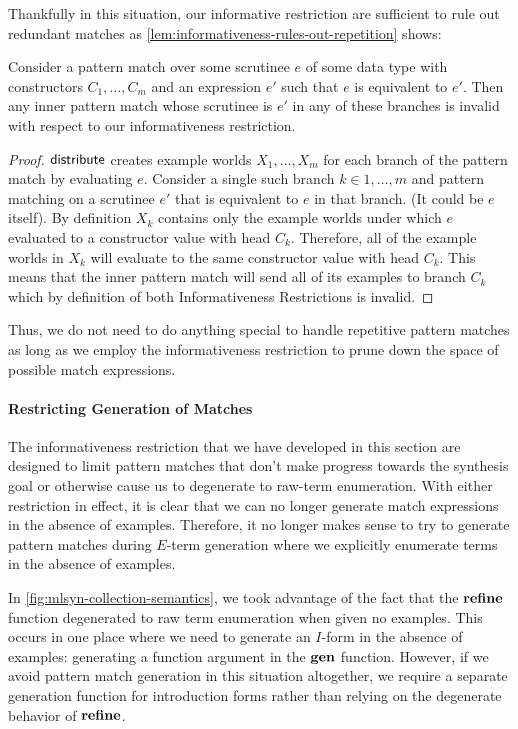 Thankfully in this situation, our informative restriction are sufficient to rule out redundant matches as \autoref{lem:informativeness-rules-out-repetition} shows:
\begin{lemma}
  Consider a pattern match over some scrutinee $e$ of some data type with constructors $C_1, …, C_m$ and an expression $e'$ such that $e$ is equivalent to $e'$.
  Then any inner pattern match whose scrutinee is $e'$ in any of these branches is invalid with respect to our informativeness restriction.
  \label{lem:informativeness-rules-out-repetition}
\end{lemma}
\begin{proof}
  $\mathsf{distribute}$ creates example worlds $Χ_1, …, Χ_m$ for each branch of the pattern match by evaluating $e$.
  Consider a single such branch $k ∈ 1, …, m$ and pattern matching on a scrutinee $e'$ that is equivalent to $e$ in that branch.
  (It could be $e$ itself).
  By definition $Χ_k$ contains only the example worlds under which $e$ evaluated to a constructor value with head $C_k$.
  Therefore, all of the example worlds in $Χ_k$ will evaluate to the same constructor value with head $C_k$.
  This means that the inner pattern match will send all of its examples to branch $C_k$ which by definition of both Informativeness Restrictions is invalid.
\end{proof}
Thus, we do not need to do anything special to handle repetitive pattern matches as long as we employ the informativeness restriction to prune down the space of possible match expressions.

\paragraph{Restricting Generation of Matches}

The informativeness restriction that we have developed in this section are designed to limit pattern matches that don't make progress towards the synthesis goal or otherwise cause us to degenerate to raw-term enumeration.
With either restriction in effect, it is clear that we can no longer generate match expressions in the absence of examples.
Therefore, it no longer makes sense to try to generate pattern matches during $E$-term generation where we explicitly enumerate terms in the absence of examples.

In \autoref{fig:mlsyn-collection-semantics}, we took advantage of the fact that the $\mathbf{refine}$ function degenerated to raw term enumeration when given no examples.
This occurs in one place where we need to generate an $I$-form in the absence of examples: generating a function argument in the $\mathbf{gen}$ function.
However, if we avoid pattern match generation in this situation altogether, we require a separate generation function for introduction forms rather than relying on the degenerate behavior of $\mathbf{refine}$.

